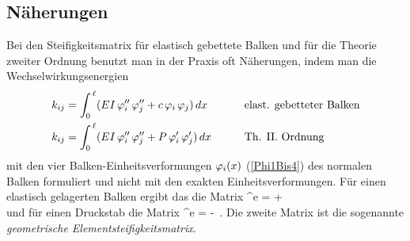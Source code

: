 \textcolor{sectionTitleBlue}{\subsection{N\"{a}herungen}}
Bei den Steifigkeitsmatrix f\"{u}r elastisch gebettete Balken und f\"{u}r die Theorie zweiter Ordnung benutzt man in der Praxis oft N\"{a}herungen, indem man die Wechselwirkungsenergien
\begin{alignat}{2}
k_{ij} &= \int_0^{\,\ell} (EI\,\varphi_i''\,\varphi_j'' + c\,\varphi_i\,\varphi_j)\,dx \qquad &&\text{elast. gebetteter Balken} \\
k_{ij} &= \int_0^{\,\ell} (EI\,\varphi_i''\,\varphi_j'' + P\,\varphi_i'\,\varphi_j')\,dx \qquad &&\text{Th. II. Ordnung}
\end{alignat}
mit den vier Balken-Einheitsverformungen $\varphi_i(x)$ (\ref{Phi1Bis4}) des normalen Balken formuliert und nicht mit den exakten Einheitsverformungen. F\"{u}r einen elastisch gelagerten Balken ergibt das die Matrix
\bfo\label{N1}
^e =   + 
\nn \\
\efo
und f\"{u}r einen Druckstab die Matrix
\bfo\label{IIN} ^e =
 - 
 \,.
\efo
Die zweite Matrix ist die sogenannte {\em geometrische Elementsteifigkeitsmatrix\/}.

